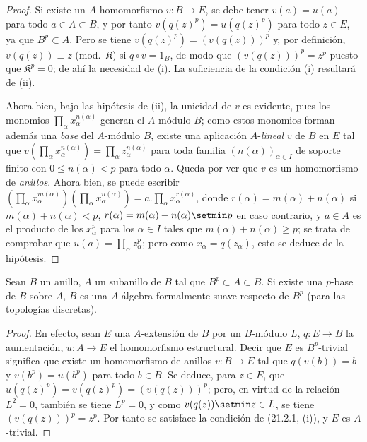 \begin{proof}
Si existe un $A$-homomorfismo $v:B\to E$, se debe tener $v(a)=u(a)$ para
todo $a\in A\subset B$, y por tanto $v(q(z)^p)=u(q(z)^p)$ para todo $z\in E$,
ya que $B^p\subset A$. Pero se tiene $v(q(z)^p)=(v(q(z)))^p$ y, por definición,
$v(q(z))\equiv z$ (mod.~$\mathfrak K$) si $q\circ v=1_B$, de modo que
$(v(q(z)))^p=z^p$ puesto que $\mathfrak K^p=0$; de ahí la necesidad de (i).
La suficiencia de la condición (i) resultará de (ii).

Ahora bien, bajo las hipótesis de (ii), la unicidad de $v$ es evidente, pues
los monomios $\prod_\alpha x_\alpha^{n(\alpha)}$ generan el $A$-módulo $B$;
como estos monomios forman además una \emph{base} del $A$-módulo $B$, existe
una aplicación $A$-\emph{lineal} $v$ de $B$ en $E$ tal que
$v(\prod_\alpha x_\alpha^{n(\alpha)})=\prod_\alpha z_\alpha^{n(\alpha)}$
para toda familia $(n(\alpha))_{\alpha\in I}$ de soporte finito con
$0\leq n(\alpha)<p$ para todo $\alpha$. Queda por ver que $v$ es un
homomorfismo de \emph{anillos}. Ahora bien, se puede escribir
$(\prod_\alpha x_\alpha^{m(\alpha)})(\prod_\alpha x_\alpha^{n(\alpha)})
=a.\prod_\alpha x_\alpha^{r(\alpha)}$, donde
$r(\alpha)=m(\alpha)+n(\alpha)$ si $m(\alpha)+n(\alpha)<p$,
$r(\alpha)=m(\alpha)+n(\alpha)\setmin p$ en caso contrario, y $a\in A$
es el producto de los $x_\alpha^p$ para los $\alpha\in I$ tales que
$m(\alpha)+n(\alpha)\geq p$; se trata de comprobar que
$u(a)=\prod_\alpha z_\alpha^p$; pero como $x_\alpha=q(z_\alpha)$, esto se
deduce de la hipótesis.
\end{proof}

\begin{corollary}[21.2.2]
\label{0.21.2.2-fr}
Sean $B$ un anillo, $A$ un subanillo de $B$ tal que $B^p\subset A\subset B$.
Si existe una $p$-base de $B$ sobre $A$, $B$ es una $A$-álgebra formalmente
suave respecto de $B^p$ (para las topologías discretas).
\end{corollary}

\begin{proof}
En efecto, sean $E$ una $A$-extensión de $B$ por un $B$-módulo $L$, $q:E\to B$ la
aumentación, $u:A\to E$ el homomorfismo estructural. Decir que $E$ es
$B^p$-trivial significa que existe un homomorfismo de anillos $v:B\to E$
tal que $q(v(b))=b$ y $v(b^p)=u(b^p)$ para todo $b\in B$. Se deduce, para
$z\in E$, que $u(q(z)^p)=v(q(z)^p)=(v(q(z)))^p$; pero, en virtud de la
relación $L^2=0$, también se tiene $L^p=0$, y como $v(q(z))\setmin z\in L$, se
tiene $(v(q(z)))^p=z^p$. Por tanto se satisface la condición de (21.2.1, (i)), y $E$ es $A$-trivial.
\end{proof}

